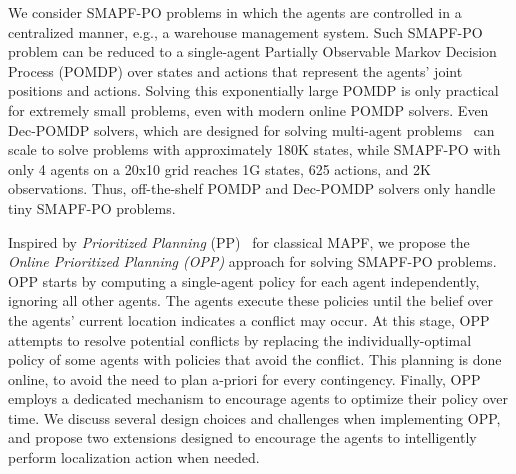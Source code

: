 \documentclass[letterpaper]{article}
\begin{document}
We consider SMAPF-PO problems in which the agents are controlled in a centralized manner, e.g., a warehouse management system.
Such SMAPF-PO problem can be reduced to a single-agent Partially Observable Markov Decision Process (POMDP) over states and actions that represent the agents' joint positions and actions. Solving this exponentially large POMDP is only practical for extremely small problems, even with modern online POMDP solvers. Even Dec-POMDP solvers, which are designed for solving multi-agent problems~\cite{amato2019modeling} can scale to solve problems with approximately 180K states, while SMAPF-PO with only 4 agents on a 20x10 grid reaches 1G states, 625 actions, and 2K observations.
Thus, off-the-shelf POMDP and Dec-POMDP solvers only handle tiny SMAPF-PO problems.




Inspired by \emph{Prioritized Planning} (PP)~\cite{silver2005cooperative} for classical MAPF,
we propose the \emph{Online Prioritized Planning (OPP)} approach for solving SMAPF-PO problems.
OPP starts by computing a single-agent policy for each agent independently, ignoring all other agents.
The agents execute these policies until the belief over the agents' current location indicates a conflict may occur. %
At this stage, OPP attempts to resolve potential conflicts by replacing the individually-optimal policy of some agents with policies that avoid the conflict. This planning is done online, to avoid the need to plan a-priori for every contingency. Finally, OPP employs a dedicated mechanism to encourage agents to optimize their policy over time.
We discuss several design choices and challenges when implementing OPP, and propose two extensions designed to encourage the agents to intelligently perform localization action when needed.
\end{document}
